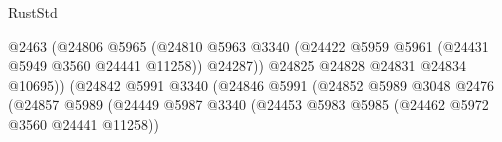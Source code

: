 \begin{lexlean}{RustStd}
\begin{coremodule}
                                                          @2463
                                                          (@24806
                                                            @5965
                                                            (@24810
                                                              @5963
                                                              @3340
                                                              (@24422
                                                                @5959
                                                                @5961
                                                                (@24431 @5949 @3560 @24441 @11258))
                                                              @24287))
                                                          @24825
                                                          @24828
                                                          @24831
                                                          @24834
                                                          @10695))
                                                      (@24842
                                                        @5991
                                                        @3340
                                                        (@24846
                                                          @5991
                                                          (@24852
                                                            @5989
                                                            @3048
                                                            @2476
                                                            (@24857
                                                              @5989
                                                              (@24449
                                                                @5987
                                                                @3340
                                                                (@24453
                                                                  @5983
                                                                  @5985
                                                                  (@24462
                                                                    @5972
                                                                    @3560
                                                                    @24441
                                                                    @11258))

\end{coremodule}
\end{lexlean}
